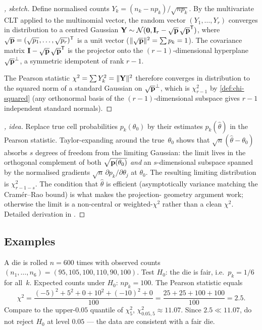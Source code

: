 \begin{proof}[, sketch]
Define normalised counts $Y_k = (n_k - n p_k)/\sqrt{n p_k}$. By the
multivariate CLT applied to the multinomial vector, the random
vector $(Y_1, \dots, Y_r)$ converges in distribution to a centred
Gaussian $\mathbf{Y} \sim \mathcal{N}(\mathbf{0}, \mathbf{I}_r - \sqrt{\mathbf{p}}\,\sqrt{\mathbf{p}}^{\mathsf{T}})$,
where $\sqrt{\mathbf{p}} = (\sqrt{p_1}, \dots, \sqrt{p_r})^{\mathsf{T}}$ is a
unit vector ($\|\sqrt{\mathbf{p}}\|^2 = \sum p_k = 1$). The covariance
matrix $\mathbf{I} - \sqrt{\mathbf{p}}\,\sqrt{\mathbf{p}}^{\mathsf{T}}$ is the
projector onto the $(r - 1)$-dimensional hyperplane
$\sqrt{\mathbf{p}}^{\perp}$, a symmetric idempotent of rank $r - 1$.

The Pearson statistic $\chi^2 = \sum Y_k^2 = \|\mathbf{Y}\|^2$
therefore converges in distribution to the squared norm of a
standard Gaussian on $\sqrt{\mathbf{p}}^{\perp}$, which is
$\chi^2_{r - 1}$ by \cref{def:chi-squared} (any orthonormal basis
of the $(r-1)$-dimensional subspace gives $r - 1$ independent
standard normals).
\end{proof}

\begin{proof}[, idea]
Replace true cell probabilities $p_k(\theta_0)$ by their estimates
$p_k(\hat \theta)$ in the Pearson statistic. Taylor-expanding around
the true~$\theta_0$ shows that $\sqrt n (\hat \theta - \theta_0)$
absorbs $s$ degrees of freedom from the limiting Gaussian: the
limit lives in the orthogonal complement of both
$\sqrt{\mathbf{p}(\theta_0)}$ \emph{and} an $s$-dimensional subspace
spanned by the normalised gradients
$\sqrt{n}\, \partial p_k/\partial \theta_j$ at $\theta_0$. The
resulting limiting distribution is $\chi^2_{r - 1 - s}$. The
condition that $\hat \theta$ is efficient (asymptotically variance
matching the Cramér–Rao bound) is what makes the projection-
geometry argument work; otherwise the limit is a non-central or
weighted-$\chi^2$ rather than a clean $\chi^2$. Detailed
derivation in \cite[Ch.~IX, \S~3]{Sevastyanov1982}.
\end{proof}

\subsection*{Examples}

\begin{example}
\label{ex:fair-die-test}
A die is rolled $n = 600$ times with observed counts
$(n_1, \dots, n_6) = (95, 105, 100, 110, 90, 100)$. Test
$H_0$: the die is fair, i.e.\ $p_k = 1/6$ for all~$k$. Expected
counts under $H_0$: $n p_k = 100$. The Pearson statistic equals
\[
  \chi^2 = \frac{(-5)^2 + 5^2 + 0 + 10^2 + (-10)^2 + 0}{100} = \frac{25 + 25 + 100 + 100}{100} = 2.5.
\]
Compare to the upper-$0.05$ quantile of $\chi^2_5$,
$\chi^2_{0.05, 5} \approx 11.07$. Since $2.5 \ll 11.07$, do not
reject $H_0$ at level $0.05$ — the data are consistent with a
fair die.
\end{example}

